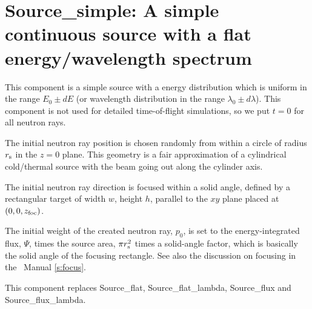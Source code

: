 \section{Source\_simple: A simple continuous source
with a flat energy/wavelength spectrum}
\label{source-simple}


This component is
a simple source with a energy distribution which is uniform
in the range $E_0 \pm dE$
(or wavelength distribution in the range $\lambda_0 \pm d\lambda$).
This component is not used for detailed time-of-flight simulations,
so we put $t=0$ for all neutron rays.

The initial neutron ray position is chosen randomly from within a
circle of radius $r_{\rm s}$ in the $z=0$ plane.
This geometry is a fair approximation
of a cylindrical cold/thermal source with the beam going out along
the cylinder axis.

The initial neutron ray direction is focused within
a solid angle, defined by a rectangular target of width
$w$, height $h$, parallel to
the $xy$ plane placed at $(0,0,z_{\rm foc})$.

The initial weight of the created neutron ray, $p_0$, is set to the
energy-integrated flux, $\Psi$, times the source area, $\pi r_{\rm s}^2$
times a solid-angle factor, which is basically the
solid angle of the focusing rectangle.
See also the discussion on focusing in the \MCS\ Manual \ref{s:focus}.

This component replaces Source\_flat, Source\_flat\_lambda,
Source\_flux and Source\_flux\_lambda.
